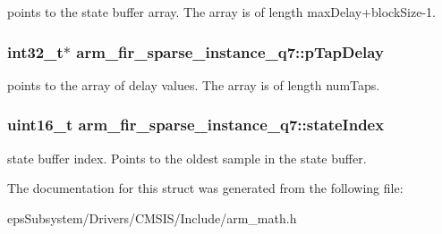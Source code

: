 points to the state buffer array. The array is of length max\-Delay+block\-Size-\/1. \hypertarget{structarm__fir__sparse__instance__q7_ac625393c84bc0342ffdf26fc4eba1ac1}{
\subsubsection[{p\-Tap\-Delay}]{\setlength{\rightskip}{0pt plus 5cm}int32\-\_\-t$\ast$ arm\-\_\-fir\-\_\-sparse\-\_\-instance\-\_\-q7\-::p\-Tap\-Delay}}\label{structarm__fir__sparse__instance__q7_ac625393c84bc0342ffdf26fc4eba1ac1}
points to the array of delay values. The array is of length num\-Taps. \hypertarget{structarm__fir__sparse__instance__q7_a2d2e65473fe3a3f2b953b4e0b60824df}{
\subsubsection[{state\-Index}]{\setlength{\rightskip}{0pt plus 5cm}uint16\-\_\-t arm\-\_\-fir\-\_\-sparse\-\_\-instance\-\_\-q7\-::state\-Index}}\label{structarm__fir__sparse__instance__q7_a2d2e65473fe3a3f2b953b4e0b60824df}
state buffer index. Points to the oldest sample in the state buffer. 

The documentation for this struct was generated from the following file\-:\begin{DoxyCompactItemize}
\item 
eps\-Subsystem/\-Drivers/\-C\-M\-S\-I\-S/\-Include/arm\-\_\-math.\-h\end{DoxyCompactItemize}
